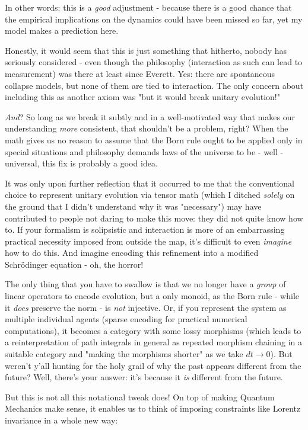 \documentclass{article}
\begin{document}
In other words: this is a \textit{good} adjustment - because there is a good chance that the empirical implications on the dynamics could have been missed so far, yet my model makes a prediction here.

Honestly, it would seem that this is just something that hitherto, nobody has seriously considered - even though the philosophy (interaction as such can lead to measurement) was there at least since Everett. Yes: there are spontaneous collapse models, but none of them are tied to interaction. The only concern about including this as another axiom was "but it would break unitary evolution!"

\textit{And}? So long as we break it subtly and in a well-motivated way that makes our understanding \textit{more} consistent, that shouldn't be a problem, right? When the math gives us no reason to assume that the Born rule ought to be applied only in special situations and philosophy demands laws of the universe to be - well - universal, this fix is probably a good idea.

It was only upon further reflection that it occurred to me that the conventional choice to represent unitary evolution via tensor math (which I ditched \textit{solely} on the ground that I didn't understand why it was "necessary") may have contributed to people not daring to make this move: they did not quite know how to. If your formalism is solipsistic and interaction is more of an embarrassing practical necessity imposed from outside the map, it's difficult to even \textit{imagine} how to do this. And imagine encoding this refinement into a modified Schrödinger equation - oh, the horror!

The only thing that you have to swallow is that we no longer have a \textit{group} of linear operators to encode evolution, but a only monoid, as the Born rule - while it \textit{does} preserve the norm - is \textit{not} injective. Or, if you represent the system as multiple individual agents (sparse encoding for practical numerical computations), it becomes a category with some lossy morphisms (which leads to a reinterpretation of path integrals in general as repeated morphism chaining in a suitable category and "making the morphisms shorter" as we take $dt\to 0$). But weren't y'all hunting for the holy grail of why the past appears different from the future? Well, there's your answer: it's because it \textit{is} different from the future.

But this is not all this notational tweak does! On top of making Quantum Mechanics make sense, it enables us to think of imposing constraints like Lorentz invariance in a whole new way:
\end{document}
